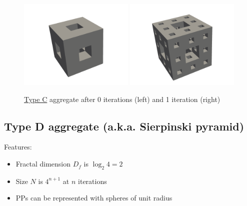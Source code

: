 \documentclass{article}
\begin{document}
\begin{figure}[htp]
\includegraphics[width=0.49\textwidth]{resources/type-c-img-1.png}
\includegraphics[width=0.49\textwidth]{resources/type-c-img-2.png}
\caption*{\underline{Type C} aggregate after 0 iterations (left) and 1 iteration (right)}
\end{figure}

\subsection*{Type D aggregate (a.k.a. Sierpinski pyramid)}

Features:

\begin{itemize}
	\item Fractal dimension $D_f$ is $\log_{2}{4}=2$
	\item Size $N$ is $4^{n+1}$ at $n$ iterations
	\item PPs can be represented with spheres of unit radius
\end{itemize}
\end{document}
